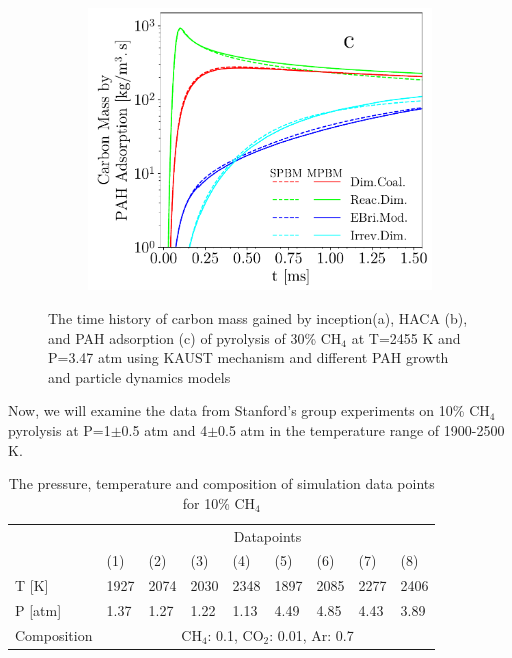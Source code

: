 \begin{figure}[H]
	\begin{subfigure}[t]{0.32\textwidth}
		\includegraphics[width=1\textwidth]{Figures/Results/Shocktube/Stanford/June/stsh_single_PAH.pdf}
	\end{subfigure}
	\caption{The time history of carbon mass gained by inception(a), HACA (b), and PAH adsorption (c) of pyrolysis of 30\% $\mathrm{CH_4}$ at T=2455 K and P=3.47 atm using KAUST mechanism and different PAH growth and particle dynamics models}
	\label{fig:shocktubecarbon} 
\end{figure}


%
%

Now, we will examine the data from Stanford's group experiments on 10\% $\mathrm{CH_4}$ pyrolysis at P=1$\pm$0.5 atm and 4$\pm$0.5 atm in the temperature range of 1900-2500 K.


\begin{table}[]
	\caption{The pressure, temperature and composition of simulation data points for 10\% $\mathrm{CH_4}$}
	\centering
	\begin{tabular}{l|llllllll|}
		\cline{2-9}
		& \multicolumn{8}{c|}{Datapoints}                       \\ \cline{2-9} 
		& (1)  & (2)  & (3)  & (4)  & (5)  & (6)  & (7)  & (8)  \\ \hline
		\multicolumn{1}{|l|}{T {[}K{]}}   & 1927 & 2074 & 2030 & 2348 & 1897 & 2085 & 2277 & 2406 \\ \hline
		\multicolumn{1}{|l|}{P {[}atm{]}} & 1.37 & 1.27 & 1.22 & 1.13 & 4.49 & 4.85 & 4.43 & 3.89 \\ \hline
		\multicolumn{1}{|l|}{Composition} & \multicolumn{8}{c|}{$\mathrm{CH_4}$: 0.1, $\mathrm{CO_2}$: 0.01, Ar: 0.7}               \\ \hline
	\end{tabular}
	\label{tab:shocktubest_CH4_10} 
\end{table}


